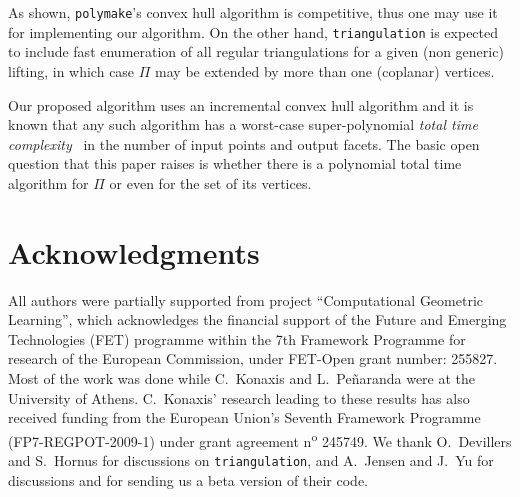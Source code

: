 \documentclass{article}
\begin{document}
As shown, {\tt polymake}'s convex hull algorithm is competitive,
thus one may use it for implementing our algorithm. 
On the other hand, {\tt triangulation} is expected to include fast
enumeration of all regular triangulations for a given (non generic)
lifting, in which case $\varPi$ may be extended by more
than one (coplanar) vertices.

Our proposed algorithm uses an incremental convex hull algorithm and it is
known that any such algorithm has a worst-case super-polynomial \emph{total time
complexity}~ in
the number of input points and output facets.
The basic open question that this paper raises is whether there is a polynomial
total time algorithm for $\varPi$ or even for the set of its vertices.

\section{Acknowledgments}
All authors were partially supported from project
``Computational Geometric Learning'', which acknowledges the
financial support of the Future and Emerging Technologies (FET)
programme within the 7th Framework Programme for research of
the European Commission, under FET-Open grant number: 255827.
Most of the work was done while C.~Konaxis and L.~Pe{\~n}aranda
were at the University of Athens.
C.~Konaxis' research leading to these results has also received
funding from the European Union's 
Seventh Framework Programme (FP7-REGPOT-2009-1) under grant agreement n\textsuperscript{o} 245749.
We thank O.~Devillers and S.~Hornus for discussions on
\texttt{triangulation}, and A.\ Jensen and J.~Yu for discussions 
and for sending us a beta version of their code.



\end{document}

